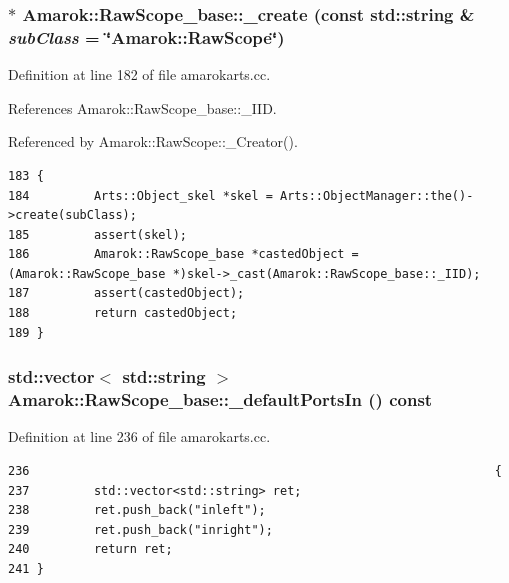 \subsubsection{ $\ast$ Amarok::Raw\-Scope\_\-base::\_\-create (const std::string \& {\em sub\-Class} = \char`\"{}Amarok::Raw\-Scope\char`\"{})\hspace{0.3cm}{\tt  [static, inherited]}}\label{classAmarok_1_1RawScope__base_Amarok_1_1RawScope__stube0}




Definition at line 182 of file amarokarts.cc.

References Amarok::Raw\-Scope\_\-base::\_\-IID.

Referenced by Amarok::Raw\-Scope::\_\-Creator().



\footnotesize\begin{verbatim}183 {
184         Arts::Object_skel *skel = Arts::ObjectManager::the()->create(subClass);
185         assert(skel);
186         Amarok::RawScope_base *castedObject = (Amarok::RawScope_base *)skel->_cast(Amarok::RawScope_base::_IID);
187         assert(castedObject);
188         return castedObject;
189 }
\end{verbatim}\normalsize 
{}
\subsubsection{\setlength{\rightskip}{0pt plus 5cm}std::vector$<$ std::string $>$ Amarok::Raw\-Scope\_\-base::\_\-default\-Ports\-In () const\hspace{0.3cm}{\tt  [virtual, inherited]}}\label{classAmarok_1_1RawScope__base_Amarok_1_1RawScope__stuba5}




Definition at line 236 of file amarokarts.cc.



\footnotesize\begin{verbatim}236                                                                 {
237         std::vector<std::string> ret;
238         ret.push_back("inleft");
239         ret.push_back("inright");
240         return ret;
241 }
\end{verbatim}\normalsize 
{}
